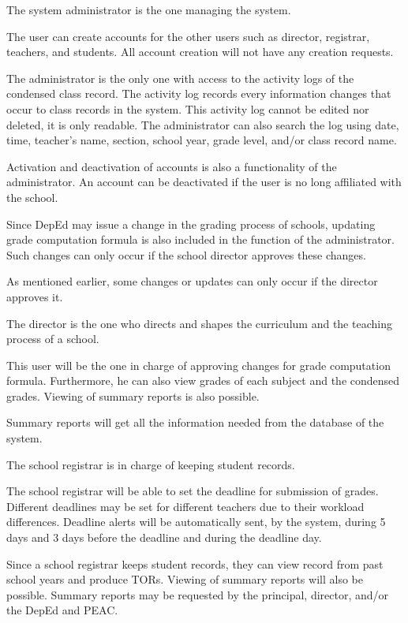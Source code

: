 \documentclass[11pt,a4paper,titlepage]{article}
\begin{document}
The system administrator is the one managing the system.

The user can create accounts for the other users such as director, registrar, teachers, and students. All account creation will not have any creation requests.

The administrator is the only one with access to the activity logs of the condensed class record. The activity log records every information changes that occur to class records in the system. This activity log cannot be edited nor deleted, it is only readable. The administrator can also search the log using date, time, teacher's name, section, school year, grade level, and/or class record name.

Activation and deactivation of accounts is also a functionality of the administrator. An account can be deactivated if the user is no long affiliated with the school.

Since DepEd may issue a change in the grading process of schools, updating grade computation formula is also included in the function of the administrator. Such changes can only occur if the school director approves these changes.

As mentioned earlier, some changes or updates can only occur if the director approves it.

The director is the one who directs and shapes the curriculum and the teaching process of a school.

This user will be the one in charge of approving changes for grade computation formula. Furthermore, he can also view grades of each subject and the condensed grades. Viewing of summary reports is also possible.

Summary reports will get all the information needed from the database of the system.

The school registrar is in charge of keeping student records.

The school registrar will be able to set the deadline for submission of grades. Different deadlines may be set for different teachers due to their workload differences. Deadline alerts will be automatically sent, by the system, during 5 days and 3 days before the deadline and during the deadline day.

Since a school registrar keeps student records, they can view record from past school years and produce TORs. Viewing of summary reports will also be possible. Summary reports may be requested by the principal, director, and/or the DepEd and PEAC.
\end{document}
